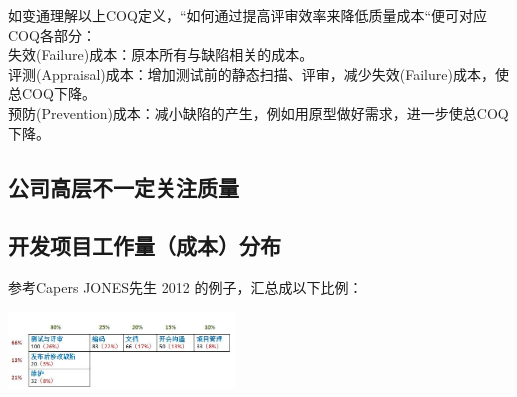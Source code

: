 如变通理解以上COQ定义，``如何通过提高评审效率来降低质量成本``便可对应COQ各部分：\\
失效(Failure)成本：原本所有与缺陷相关的成本。\\
评测(Appraisal)成本：增加测试前的静态扫描、评审，减少失效(Failure)成本，使总COQ下降。\\
预防(Prevention)成本：减小缺陷的产生，例如用原型做好需求，进一步使总COQ下降。\\

\hypertarget{ux516cux53f8ux9ad8ux5c42ux4e0dux4e00ux5b9aux5173ux6ce8ux8d28ux91cf}{%
\subsection{公司高层不一定关注质量}\label{ux516cux53f8ux9ad8ux5c42ux4e0dux4e00ux5b9aux5173ux6ce8ux8d28ux91cf}}


\hypertarget{ux5f00ux53d1ux9879ux76eeux5de5ux4f5cux91cfux6210ux672cux5206ux5e03}{%
\subsection{开发项目工作量（成本）分布}\label{ux5f00ux53d1ux9879ux76eeux5de5ux4f5cux91cfux6210ux672cux5206ux5e03}}

参考Capers JONES先生 2012 的例子，汇总成以下比例：

\includegraphics[width=6cm]{AR1成本占比.jpg}

